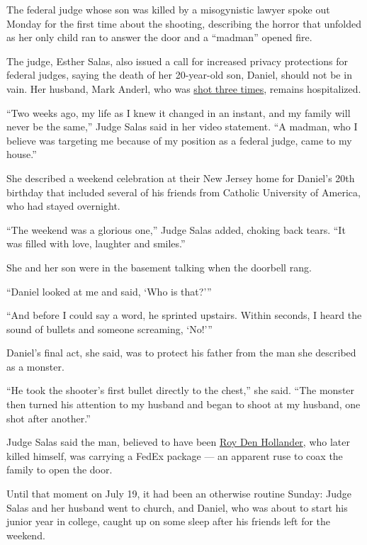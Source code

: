 The federal judge whose son was killed by a misogynistic lawyer spoke
out Monday for the first time about the shooting, describing the horror
that unfolded as her only child ran to answer the door and a ``madman''
opened fire.

The judge, Esther Salas, also issued a call for increased privacy
protections for federal judges, saying the death of her 20-year-old son,
Daniel, should not be in vain. Her husband, Mark Anderl, who was
\href{https://www.nytimes.com/2020/07/20/nyregion/esther-salas.html}{shot
three times}, remains hospitalized.

``Two weeks ago, my life as I knew it changed in an instant, and my
family will never be the same,'' Judge Salas said in her video
statement. ``A madman, who I believe was targeting me because of my
position as a federal judge, came to my house.''

She described a weekend celebration at their New Jersey home for
Daniel's 20th birthday that included several of his friends from
Catholic University of America, who had stayed overnight.

``The weekend was a glorious one,'' Judge Salas added, choking back
tears. ``It was filled with love, laughter and smiles.''

She and her son were in the basement talking when the doorbell rang.

``Daniel looked at me and said, `Who is that?'''

``And before I could say a word, he sprinted upstairs. Within seconds, I
heard the sound of bullets and someone screaming, `No!'''

Daniel's final act, she said, was to protect his father from the man she
described as a monster.

``He took the shooter's first bullet directly to the chest,'' she said.
``The monster then turned his attention to my husband and began to shoot
at my husband, one shot after another.''

Judge Salas said the man, believed to have been
\href{https://www.nytimes.com/2020/07/25/nyregion/roy-den-hollander-esther-salas-list.html}{Roy
Den Hollander}, who later killed himself, was carrying a FedEx package
--- an apparent ruse to coax the family to open the door.

Until that moment on July 19, it had been an otherwise routine Sunday:
Judge Salas and her husband went to church, and Daniel, who was about to
start his junior year in college, caught up on some sleep after his
friends left for the weekend.

